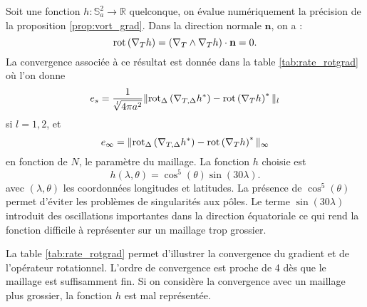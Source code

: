 Soit une fonction $h : \mathbb{S}_a^2 \rightarrow \mathbb{R}$ quelconque, on évalue numériquement la précision de la proposition \ref{prop:vort_grad}. Dans la direction normale $\mathbf{n}$, on a :
\begin{equation}
\text{rot}\left( \nabla_T h \right) = \left( \nabla_T \wedge \nabla_T h \right) \cdot \mathbf{n} = 0.
\label{eq:rot_grad}
\end{equation}
La convergence associée à ce résultat est donnée dans la table \ref{tab:rate_rotgrad} où l'on donne
\begin{equation}
e_s = \dfrac{1}{\sqrt[l]{4 \pi a^2}} \| \text{rot}_{\Delta} \left( \nabla_{T,\Delta} h^* \right) - \text{rot} \left( \nabla_{T} h \right)^* \|_l
\end{equation}
si $l= 1,2$, et
\begin{equation}
e_{\infty} =  \| \text{rot}_{\Delta} \left( \nabla_{T,\Delta} h^* \right) - \text{rot} \left( \nabla_{T} h \right)^* \|_{\infty}
\end{equation}
en fonction de $N$, le paramètre du maillage. La fonction $h$ choisie est 
\begin{equation}
h(\lambda, \theta) = \cos^5 ( \theta ) \sin ( 30 \lambda ).
\end{equation}
avec $(\lambda, \theta)$ les coordonnées longitudes et latitudes.
La présence de $\cos^5 (\theta)$ permet d'éviter les problèmes de singularités aux pôles. Le terme $\sin ( 30 \lambda)$ introduit des oscillations importantes dans la direction équatoriale ce qui rend la fonction difficile à représenter sur un maillage trop grossier.

La table \ref{tab:rate_rotgrad} permet d'illustrer la convergence du gradient et de l'opérateur rotationnel. L'ordre de convergence est proche de 4 dès que le maillage est suffisamment fin. Si on considère la convergence avec un maillage plus grossier, la fonction $h$ est mal représentée.


